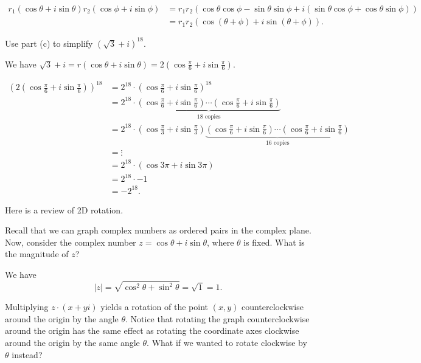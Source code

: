 \documentclass[../gatm_answers.tex]{subfiles}
\begin{document}
\begin{align*}
r_1(\cos\theta + i\sin\theta)r_2(\cos\phi + i\sin\phi) &= r_1r_2(\cos\theta\cos\phi - \sin\theta\sin\phi + i(\sin\theta\cos\phi + \cos\theta\sin\phi)) \\
&= r_1r_2(\cos(\theta+\phi) + i \sin(\theta+\phi)).
\end{align*}

\begin{inner_problem}
\item Use part (c) to simplify $(\sqrt{3}+i)^{18}$.
\end{inner_problem}

\noindent We have $\sqrt{3}+i=r(\cos\theta + i\sin\theta) = 2\left(\cos\frac{\pi}{6} + i\sin\frac{\pi}{6}\right)$.

\begin{align*}
(2\left(\cos\frac{\pi}{6} + i\sin\frac{\pi}{6}\right))^{18} &= 2^{18} \cdot \left(\cos\frac{\pi}{6} + i\sin\frac{\pi}{6}\right)^{18} \\
&= 2^{18}\cdot \underbrace{\left(\cos\frac{\pi}{6} + i\sin\frac{\pi}{6}\right)\cdots \left(\cos\frac{\pi}{6} + i\sin\frac{\pi}{6}\right)}_{18\text{ copies}} \\
&= 2^{18}\cdot \left(\cos\frac{\pi}{3} + i\sin\frac{\pi}{3}\right) \underbrace{\left(\cos\frac{\pi}{6} + i\sin\frac{\pi}{6}\right)\cdots \left(\cos\frac{\pi}{6} + i\sin\frac{\pi}{6}\right)}_{16\text{ copies}} \\
&= \vdots \\
&= 2^{18}\cdot \left(\cos 3\pi + i\sin 3\pi\right) \\
&= 2^{18}\cdot -1 \\
&= -2^{18}.
\end{align*}

\begin{outer_problem}
\item Here is a review of 2D rotation.
\end{outer_problem}

\begin{inner_problem}[start=1]
\item Recall that we can graph complex numbers as ordered pairs in the complex plane. Now, consider the complex number $z=\cos \theta + i\sin\theta$, where $\theta$ is fixed. What is the magnitude of $z$?
\end{inner_problem}

\noindent We have $$|z|=\sqrt{\cos^2\theta + \sin^2\theta}=\sqrt{1}=1.$$

\begin{inner_problem}
\item Multiplying $z\cdot(x+yi)$ yields a rotation of the point $(x,y)$ counterclockwise around the origin by the angle $\theta$. Notice that rotating the graph counterclockwise around the origin has the same effect as rotating the coordinate axes clockwise around the origin by the same angle $\theta$. What if we wanted to rotate clockwise by $\theta$ instead?
\end{inner_problem}
\end{document}
